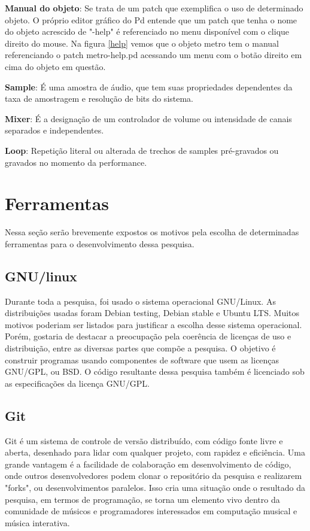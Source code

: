 \documentclass{ppgmus}
\begin{document}
\textbf{Manual do objeto}: Se trata de um patch que exemplifica o uso de determinado
objeto. O próprio editor gráfico do Pd entende que um patch que tenha o nome do objeto 
acrescido de "-help" é referenciado no menu disponível com o clique direito do mouse. 
Na figura \ref{help} vemos que o objeto metro tem o manual
referenciando o patch metro-help.pd acessando um 
menu com o botão direito em cima do objeto em questão.



\textbf{Sample}: É uma amostra de áudio, que tem suas propriedades dependentes da
taxa de amostragem e resolução de bits do sistema.


\textbf{Mixer}: É a designação de um controlador de volume ou intensidade de canais separados 
e independentes.

\textbf{Loop}: Repetição literal ou alterada de trechos de samples pré-gravados ou
gravados no momento da performance.


\section{Ferramentas}

Nessa seção serão brevemente expostos os motivos pela escolha de determinadas ferramentas para
o desenvolvimento dessa pesquisa.


\subsection{GNU/linux}

Durante toda a pesquisa, foi usado o sistema operacional GNU/Linux.
As distribuições usadas foram Debian testing, Debian stable e Ubuntu LTS.
Muitos motivos poderiam ser listados para justificar a escolha desse sistema
operacional. Porém, gostaria de destacar a preocupação pela coerência de licenças
de uso e distribuição, entre as diversas partes que compõe a pesquisa.
O objetivo é construir programas usando componentes de software que usem as licenças GNU/GPL, ou 
BSD. O código resultante dessa pesquisa também é licenciado sob as especificações
da licença GNU/GPL.



\subsection{Git}

Git é um sistema de controle de versão distribuído, com código fonte livre e aberta, desenhado para lidar com qualquer
projeto, com rapidez e eficiência.
Uma grande vantagem é a facilidade de colaboração em desenvolvimento de código, onde outros desenvolvedores
podem clonar o repositório da pesquisa e realizarem "forks", ou desenvolvimentos paralelos. Isso cria uma situação 
onde o resultado da pesquisa, em termos de programação, se torna um elemento vivo dentro da comunidade de músicos e 
programadores interessados em computação musical e música interativa.
\end{document}
